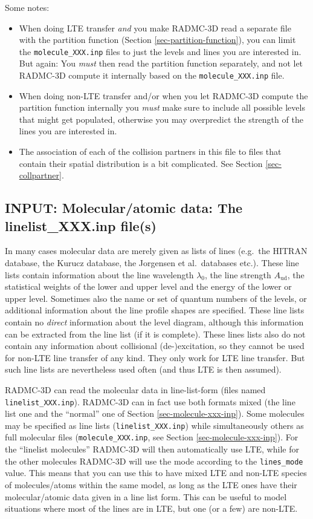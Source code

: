\documentclass{report}
\begin{document}
Some notes:
\begin{itemize}
\item When doing LTE transfer {\em and} you make RADMC-3D read a separate
  file with the partition function (Section \ref{sec-partition-function}),
  you can limit the {\small\tt molecule\_XXX.inp} files to just the levels
  and lines you are interested in. But again: You {\em must} then read the
  partition function separately, and not let RADMC-3D compute it internally
  based on the {\small\tt molecule\_XXX.inp} file.
\item When doing non-LTE transfer and/or when you let RADMC-3D compute the
  partition function internally you {\em must} make sure to include all
  possible levels that might get populated, otherwise you may overpredict
  the strength of the lines you are interested in.
\item The association of each of the collision partners in this file to
  files that contain their spatial distribution is a bit complicated. See
  Section \ref{sec-collpartner}.
\end{itemize}

\subsection{INPUT: Molecular/atomic data: The linelist\_XXX.inp file(s)}
\label{sec-linelist-xxx-inp}
In many cases molecular data are merely given as lists of lines (e.g.\ the
HITRAN database, the Kurucz database, the Jorgensen et al.~databases
etc.). These line lists contain information about the line wavelength
$\lambda_0$, the line strength $A_{\mathrm{ud}}$, the statistical weights of
the lower and upper level and the energy of the lower or upper
level. Sometimes also the name or set of quantum numbers of the levels, or
additional information about the line profile shapes are specified. These
line lists contain no {\em direct} information about the level diagram,
although this information can be extracted from the line list (if it is
complete). These lines lists also do not contain any information about
collisional (de-)excitation, so they cannot be used for non-LTE line
transfer of any kind. They only work for LTE line transfer. But such line
lists are nevertheless used often (and thus LTE is then assumed). 

RADMC-3D can read the molecular data in line-list-form (files named
{\small\tt linelist\_XXX.inp}). RADMC-3D can in fact use both formats mixed
(the line list one and the ``normal'' one of Section
\ref{sec-molecule-xxx-inp}). Some molecules may be specified as line lists
({\small\tt linelist\_XXX.inp}) while simultaneously others as full
molecular files ({\small\tt molecule\_XXX.inp}, see Section
\ref{sec-molecule-xxx-inp}).  For the ``linelist molecules'' RADMC-3D will
then automatically use LTE, while for the other molecules RADMC-3D will use
the mode according to the {\small\tt lines\_mode} value. This means that you
can use this to have mixed LTE and non-LTE species of molecules/atoms within
the same model, as long as the LTE ones have their molecular/atomic data
given in a line list form. This can be useful to model situations where most
of the lines are in LTE, but one (or a few) are non-LTE.
\end{document}
